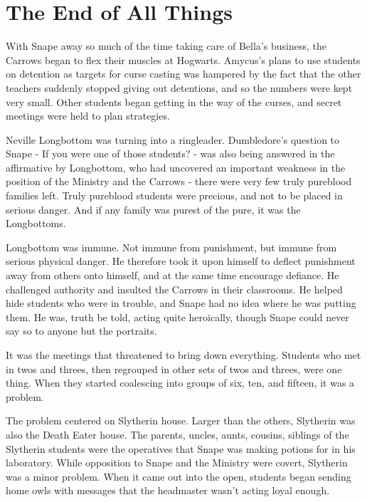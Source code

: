 
\chapter{The End of All Things}

With Snape away so much of the time taking care of Bella's business, the Carrows began to flex their muscles at Hogwarts. Amycus's plans to use students on detention as targets for curse casting was hampered by the fact that the other teachers suddenly stopped giving out detentions, and so the numbers were kept very small. Other students began getting in the way of the curses, and secret meetings were held to plan strategies.

Neville Longbottom was turning into a ringleader. Dumbledore's question to Snape - If you were one of those students? - was also being answered in the affirmative by Longbottom, who had uncovered an important weakness in the position of the Ministry and the Carrows - there were very few truly pureblood families left. Truly pureblood students were precious, and not to be placed in serious danger. And if any family was purest of the pure, it was the Longbottoms.

Longbottom was immune. Not immune from punishment, but immune from serious physical danger. He therefore took it upon himself to deflect punishment away from others onto himself, and at the same time encourage defiance. He challenged authority and insulted the Carrows in their classrooms. He helped hide students who were in trouble, and Snape had no idea where he was putting them. He was, truth be told, acting quite heroically, though Snape could never say so to anyone but the portraits.

It was the meetings that threatened to bring down everything. Students who met in twos and threes, then regrouped in other sets of twos and threes, were one thing. When they started coalescing into groups of six, ten, and fifteen, it was a problem.

The problem centered on Slytherin house. Larger than the others, Slytherin was also the Death Eater house. The parents, uncles, aunts, cousins, siblings of the Slytherin students were the operatives that Snape was making potions for in his laboratory. While opposition to Snape and the Ministry were covert, Slytherin was a minor problem. When it came out into the open, students began sending home owls with messages that the headmaster wasn't acting loyal enough.

